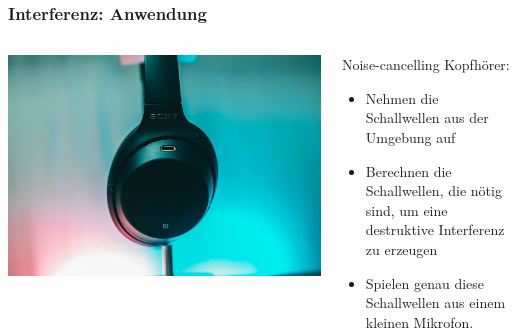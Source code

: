 \documentclass{beamer}
\begin{document}
\begin{frame}
\frametitle{Interferenz: Anwendung}

\begin{columns}[c]

\begin{column}{5cm}
\begin{center}
\includegraphics[width=\textwidth]{noise_cancelling_headphones.jpg}
\end{center}
\end{column}

\begin{column}{5cm}

\begin{block}{Noise-cancelling Kopfhörer:}

\begin{itemize}
\item 
Nehmen die Schallwellen aus der Umgebung auf 
\item
Berechnen die Schallwellen, die nötig sind, um eine destruktive Interferenz zu erzeugen
\item
Spielen genau diese Schallwellen aus einem kleinen Mikrofon.
\end{itemize}


\end{block}

\end{column}


\end{columns}

\end{frame}

\end{document}
